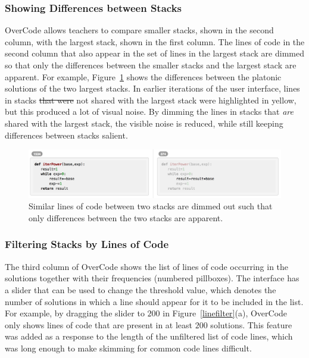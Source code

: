 \documentclass[12pt,twoside]{mitthesis}
\providecommand{\DIFdeltex}[1]{{\protect\color{red}\sout{#1}}}                      %
\providecommand{\DIFdelbegin}{} %
\providecommand{\DIFdelend}{} %
\providecommand{\DIFdel}[1]{\texorpdfstring{\DIFdeltex{#1}}{}} %
\begin{document}
\subsubsection{Showing Differences between Stacks} OverCode allows teachers to compare smaller stacks, shown in the second column, with the largest stack, shown in the first column. The lines of code in the second column that also appear in the set of lines in the largest stack are dimmed so that only the differences between the smaller stacks and the largest stack are apparent. For example, Figure~\ref{stackdifferences} shows the differences between the platonic solutions of the two largest stacks. In earlier iterations of the user interface, lines in stacks \DIFdelbegin \DIFdel{that were }\DIFdelend not shared with the largest stack were highlighted in yellow, but this produced a lot of visual noise. By dimming the lines in stacks that \textit{are} shared with the largest stack, the visible noise is reduced, while still keeping differences between stacks salient.

\begin{figure}
\centering
\includegraphics[scale=0.42]{Body/figures/overcode/lineFadingScreenshot}
\caption{Similar lines of code between two stacks are dimmed out such that only differences between the two stacks are apparent.}
\label{stackdifferences}
\end{figure}



\subsubsection{Filtering Stacks by Lines of Code} The third column of OverCode shows the list of lines of code occurring in the solutions together with their frequencies (numbered pillboxes). The interface has a slider that can be used to change the threshold value, which denotes the number of solutions in which a line should appear for it to be included in the list. For example, by dragging the slider to $200$ in Figure~\ref{linefilter}(a), OverCode only shows lines of code that are present in at least $200$ solutions. This feature was added as a response to the length of the unfiltered list of code lines, which was long enough to make skimming for common code lines difficult.
\end{document}
